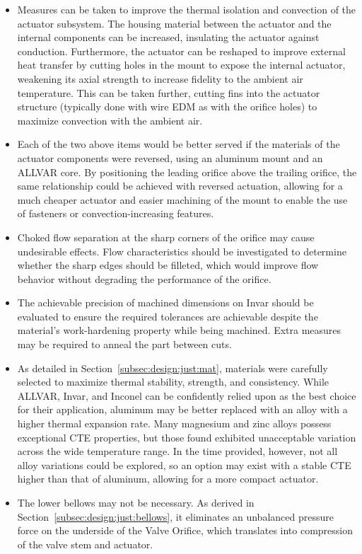 \documentclass[12pt, letterpaper]{report}%
\newcounter{mycounter}           %
\newcounter{sub}[mycounter]      %
\begin{document}
\begin{appendices}
\begin{itemize}
				without sacrificing the precision of their fusion.
			\item Measures can be taken to improve the thermal isolation and convection of the actuator subsystem. The housing material between the actuator and the internal components
				can be increased, insulating the actuator against conduction.
				Furthermore, the actuator can be reshaped to improve external heat transfer by cutting holes in the mount to expose the internal actuator, weakening its axial strength to increase fidelity to the ambient air temperature.
			This can be taken further, cutting fins into the actuator structure (typically done with wire EDM as with the orifice holes) to maximize convection with the ambient air.
			\item Each of the two above items would be better served if the materials of the actuator components were reversed, using an aluminum mount and an ALLVAR core. By positioning the leading orifice above the trailing orifice, the same relationship
				could be achieved with reversed actuation, allowing for a much cheaper actuator and easier machining of the mount to enable the use of fasteners or convection-increasing features.
			\item Choked flow separation at the sharp corners of the orifice may cause undesirable effects. Flow characteristics should be investigated to determine whether the sharp edges should be filleted, which would
				improve flow behavior without degrading the performance of the orifice.
			\item The achievable precision of machined dimensions on Invar should be evaluated to ensure the required tolerances are achievable despite the material's work-hardening property while being machined.
				Extra measures may be required to anneal the part between cuts.
			\item As detailed in Section~\ref{subsec:design:just:mat}, materials were carefully selected to maximize thermal stability, strength, and consistency.
				While ALLVAR, Invar, and Inconel can be confidently relied upon as the best choice for their application, aluminum may be better replaced with an alloy with a higher thermal expansion rate.
				Many magnesium and zinc alloys possess exceptional CTE properties, but those found exhibited unacceptable variation across the wide temperature range. In the time provided, however, not all
				alloy variations could be explored, so an option may exist with a stable CTE higher than that of aluminum, allowing for a more compact actuator.
			\item The lower bellows may not be necessary. As derived in Section~\ref{subsec:design:just:bellows}, it eliminates an unbalanced pressure force on the underside of the Valve Orifice, which translates into compression of the valve stem and actuator.

\end{itemize}
\end{appendices}
\end{document}
